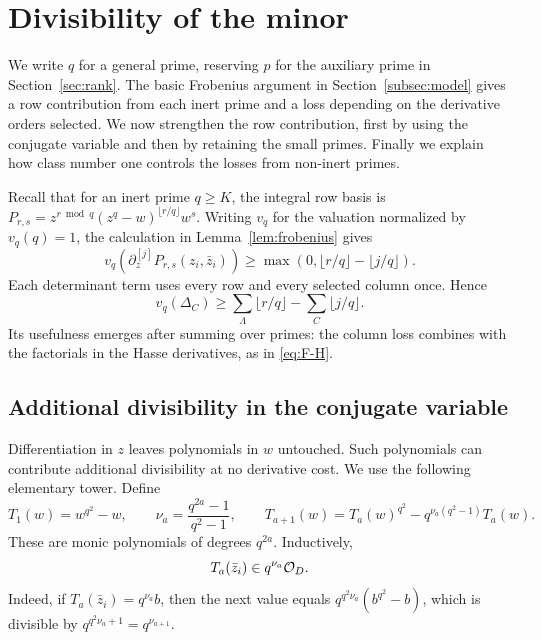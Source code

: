 \section{Divisibility of the minor}\label{sec:arithmetic}
We write $q$ for a general prime, reserving $p$ for the auxiliary prime in
Section~\ref{sec:rank}. The basic Frobenius argument in Section~\ref{subsec:model} gives a row
contribution from each inert prime and a loss depending on the derivative
orders selected. We now strengthen the row contribution, first by using the
conjugate variable and then by retaining the small primes. Finally we explain
how class number one controls the losses from non-inert primes.

Recall that for an inert prime $q\geq K$, the integral row basis is
$P_{r,s}=z^{r\bmod q}(z^q-w)^{\lfloor r/q\rfloor}w^s$.
Writing $v_q$ for the valuation normalized by $v_q(q)=1$, the calculation
in Lemma~\ref{lem:frobenius} gives
\begin{equation}\label{eq:basic-valuation}
 v_q(\partial_z^{[j]}P_{r,s}(z_i,\bar z_i))
 \geq\max(0,\lfloor r/q\rfloor-\lfloor j/q\rfloor).
\end{equation}
Each determinant term uses every row and every selected column once. Hence
\begin{equation}\label{eq:basic-minor-valuation}
 v_q(\Delta_C)\geq\sum_\Lambda\lfloor r/q\rfloor
                  -\sum_C\lfloor j/q\rfloor.
\end{equation}
Its usefulness emerges after summing over primes: the column loss combines
with the factorials in the Hasse derivatives, as in \eqref{eq:F-H}.

\subsection{Additional divisibility in the conjugate variable}
Differentiation in $z$ leaves polynomials in $w$ untouched. Such polynomials can contribute additional divisibility at no derivative cost. We use the following elementary tower. Define
\[
 T_1(w)=w^{q^2}-w,\qquad
 \nu_a=\frac{q^{2a}-1}{q^2-1},\qquad
 T_{a+1}(w)=T_a(w)^{q^2}-q^{\nu_a(q^2-1)}T_a(w).
\]
These are monic polynomials of degrees $q^{2a}$. Inductively,
\begin{equation}\label{eq:tower-value}
 T_a(\bar z_i)\in q^{\nu_a}\mathcal O_D.
\end{equation}
Indeed, if $T_a(\bar z_i)=q^{\nu_a}b$, then the next value equals
$q^{q^2\nu_a}(b^{q^2}-b)$, which is divisible by
$q^{q^2\nu_a+1}=q^{\nu_{a+1}}$.

